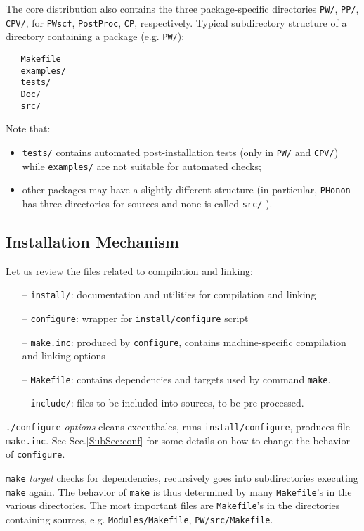 \documentclass[12pt,a4paper]{article}
\def\configure{\texttt{configure}}
\def\make.inc{\texttt{make.inc}}
\def\Makefile{\texttt{Makefile}}
\begin{document}
The core distribution also  contains the three package-specific directories
\texttt{PW/}, \texttt{PP/}, \texttt{CPV/}, for
 \texttt{PWscf}, \texttt{PostProc}, \texttt{CP}, respectively.
Typical subdirectory structure of a directory containing a package
(e.g. \texttt{PW/}):
\begin{verbatim}
   Makefile
   examples/
   tests/
   Doc/
   src/
\end{verbatim}
Note that:
\begin{itemize}
\item \texttt{tests/} contains automated post-installation tests
(only in \texttt{PW/} and \texttt{CPV/}) while \texttt{examples/}
are not suitable for automated checks;
\item other packages may have a slightly different structure (in
particular, \texttt{PHonon} has three directories for sources
and none is called \texttt{src/} ).
\end{itemize}

\subsection{Installation Mechanism}

\label{SubSec:Inst}
Let us review the files related to compilation and linking:
\begin{itemize}
\item[--] \texttt{install/}: documentation and utilities for compilation
and linking
\item[--] \configure: wrapper for \texttt{install/configure} script
\item[--] \make.inc: produced by \texttt{configure}, contains
machine-specific compilation and linking options
\item[--] \Makefile: contains dependencies and targets used by
command \texttt{make}.
\item[--] \texttt{include/}: files to be included into sources, to be
pre-processed.
\end{itemize}
\texttt{./configure} {\em options} cleans executbales,
runs \texttt{install/configure}, produces file \make.inc.
See Sec.\ref{SubSec:conf} for some details on how to change the
behavior of \configure.

\texttt{make} {\em target} checks for dependencies, recursively goes
into subdirectories executing \texttt{make} again. The behavior of
\texttt{make} is thus
determined by many \Makefile's in the various directories. The
most important files are \Makefile's in the directories containing
sources, e.g. \texttt{Modules/Makefile}, \texttt{PW/src/Makefile}.
\end{document}
